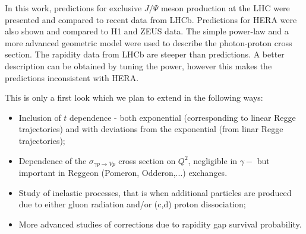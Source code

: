 \documentclass[12pt]{article}
\begin{document}
In this work, predictions for exclusive $J/\Psi$ meson production at the LHC were presented and compared to recent data from LHCb.
Predictions for HERA were also shown and compared to H1 and ZEUS data.
The simple power-law and a more advanced geometric model were used to describe the photon-proton cross section.
The rapidity data from LHCb are steeper than predictions. A better description can be obtained by tuning the power,
however this makes the predictions inconsistent with HERA. 

This is only a first look which we plan to extend in the following ways:
\begin{itemize}
\item Inclusion of $t$ dependence - both exponential (corresponding to linear Regge trajectories) and with deviations from the exponential (from linar Regge trajectories);
\item Dependence of the $\sigma_{\gamma p \rightarrow V p}$ cross section on $Q^2$, negligible in $\gamma-$ but important in Reggeon (Pomeron, Odderon,...) exchanges.
\item Study of inelastic processes, that is when additional particles are produced due to either gluon radiation and/or (c,d) proton dissociation;
\item More advanced studies of corrections due to rapidity gap survival probability.
\end{itemize}


\end{document}
